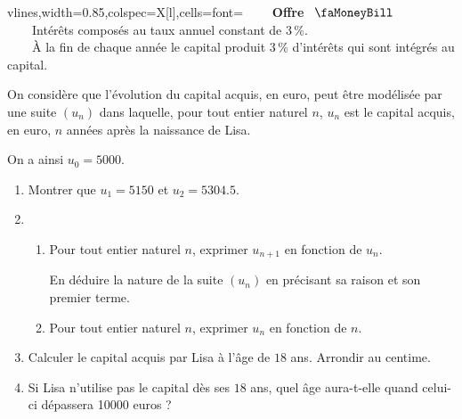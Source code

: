 \documentclass[a4paper,11pt]{article}
\begin{document}
\begin{center}
	\begin{tblr}{vlines,width=0.85\linewidth,colspec={X[l]},cells={font=\sffamily}}
		\hline
		~~~~\textbf{Offre} \hfill~$\vcenter{\hbox{\faMoneyBill}}$~~~~\\ \hline
		~~~~Intérêts composés au taux annuel constant de 3\,\%.\\
		~~~~À la fin de chaque année le capital produit 3\,\% d'intérêts qui sont intégrés au capital.\\ \hline
	\end{tblr}
\end{center}

On considère que l'évolution du capital acquis, en euro, peut être modélisée par une suite 
$\left(u_n\right)$ dans laquelle, pour tout entier naturel $n$, $u_n$ est le capital acquis, en euro, $n$ années après la naissance de Lisa.

On a ainsi $u_0 = \num{5000}$.

\begin{enumerate}
	\item Montrer que $u_1 = \num{5150}$ et $u_2 = \num{5304,5}$. 
	\item 
	\begin{enumerate}
		\item Pour tout entier naturel $n$, exprimer $u_{n+1}$ en fonction de $u_n$. 
		
		En déduire la nature de la suite $\left(u_n\right)$  en précisant sa raison et son premier terme.
		\item Pour tout entier naturel $n$, exprimer $u_n$ en fonction de $n$.
	\end{enumerate}
	\item Calculer le capital acquis par Lisa à l'âge de $18$ ans. Arrondir au centime.
	\item Si Lisa n'utilise pas le capital dès ses $18$ ans, quel âge aura-t-elle quand celui-ci dépassera \num{10000} euros ?
\end{enumerate}
\end{document}
